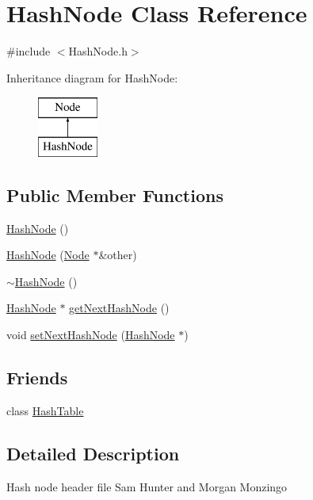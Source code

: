 \hypertarget{class_hash_node}{}\section{Hash\+Node Class Reference}
\label{class_hash_node}


{\ttfamily \#include $<$Hash\+Node.\+h$>$}

Inheritance diagram for Hash\+Node\+:\begin{figure}[H]
\begin{center}
\leavevmode
\includegraphics[height=2.000000cm]{class_hash_node}
\end{center}
\end{figure}
\subsection*{Public Member Functions}
\begin{DoxyCompactItemize}
\item 
\hyperlink{class_hash_node_a90063c7c68cbc38916c1e3903de40212}{Hash\+Node} ()
\item 
\hyperlink{class_hash_node_af85be330cc34bb55f26041c7224b5b25}{Hash\+Node} (\hyperlink{class_node}{Node} $\ast$\&other)
\item 
\hyperlink{class_hash_node_a3fc338c0a01b41b1593a05a3c4bb5c75}{$\sim$\+Hash\+Node} ()
\item 
\hyperlink{class_hash_node}{Hash\+Node} $\ast$ \hyperlink{class_hash_node_ae3a3c1f03c060e03cc01ef81aae2c734}{get\+Next\+Hash\+Node} ()
\item 
void \hyperlink{class_hash_node_a0711b28c4cbdb8a21e6df486896081b3}{set\+Next\+Hash\+Node} (\hyperlink{class_hash_node}{Hash\+Node} $\ast$)
\end{DoxyCompactItemize}
\subsection*{Friends}
\begin{DoxyCompactItemize}
\item 
class \hyperlink{class_hash_node_a574ea806a7ec4e2f0fa54ed7da67b628}{Hash\+Table}
\end{DoxyCompactItemize}


\subsection{Detailed Description}
Hash node header file Sam Hunter and Morgan Monzingo 

